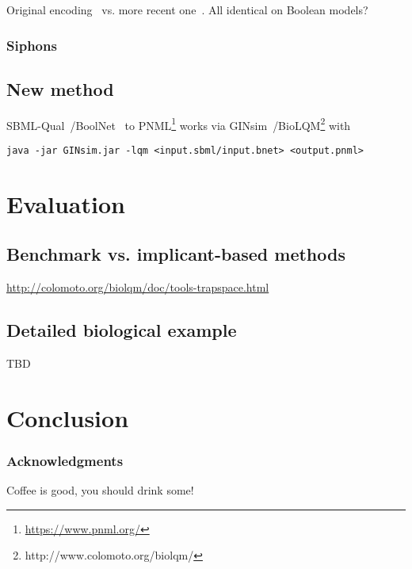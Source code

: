 \documentclass[runningheads]{llncs}
\begin{document}
Original encoding~\cite{chaouiya2004qualitative,chaouiya2011petri} vs. more recent one~\cite{chatain2014characterization}.
All identical on Boolean models?

\subsubsection{Siphons}

\subsection{New method}

SBML-Qual~\cite{chaouiya2013sbml}/BoolNet~\cite{mussel2010boolnet,klarner2017pyboolnet} to PNML\footnote{\url{https://www.pnml.org/}} works via GINsim~\cite{chaouiya2012logical}/BioLQM\footnote{http://www.colomoto.org/biolqm/} with
\begin{verbatim}
java -jar GINsim.jar -lqm <input.sbml/input.bnet> <output.pnml>
\end{verbatim}

\section{Evaluation}
\subsection{Benchmark vs. implicant-based methods}

\url{http://colomoto.org/biolqm/doc/tools-trapspace.html}

\subsection{Detailed biological example}

TBD

\section{Conclusion}

\subsubsection{Acknowledgments}
Coffee is good, you should drink some!



\end{document}
